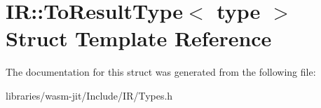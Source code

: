 \hypertarget{struct_i_r_1_1_to_result_type}{}\section{IR\+:\+:To\+Result\+Type$<$ type $>$ Struct Template Reference}
\label{struct_i_r_1_1_to_result_type}


The documentation for this struct was generated from the following file\+:\begin{DoxyCompactItemize}
\item 
libraries/wasm-\/jit/\+Include/\+I\+R/Types.\+h\end{DoxyCompactItemize}
